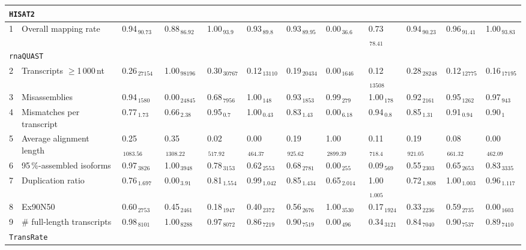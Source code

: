 \documentclass{scrartcl}
\begin{document}
\begin{landscape}
\begin{table}
\begin{scriptsize}
\begin{tabular}{llllllllllll}
\multicolumn{11}{l}{\texttt{HISAT2}}\\ 
\midrule
1 & Overall mapping rate  & 0.94$_{\,90.73}$ & 0.88$_{\,86.92}$ & 1.00$_{\,93.9}$ & 0.93$_{\,89.8}$ & 0.93$_{\,89.95}$ & 0.00$_{\,36.6}$ & 0.73$_{\,78.41}$ & 0.94$_{\,90.23}$ & 0.96$_{\,91.41}$ & 1.00$_{\,93.83}$ \\\midrule
\multicolumn{11}{l}{\texttt{rnaQUAST}}\\ 
\midrule
2 & Transcripts $\geq$1\,000\,nt  & 0.26$_{\,27154}$ & 1.00$_{\,98196}$ & 0.30$_{\,30767}$ & 0.12$_{\,13110}$ & 0.19$_{\,20434}$ & 0.00$_{\,1646}$ & 0.12$_{\,13508}$ & 0.28$_{\,28248}$ & 0.12$_{\,12775}$ & 0.16$_{\,17195}$ \\3 & Misassemblies  & 0.94$_{\,1580}$ & 0.00$_{\,24845}$ & 0.68$_{\,7956}$ & 1.00$_{\,148}$ & 0.93$_{\,1853}$ & 0.99$_{\,279}$ & 1.00$_{\,178}$ & 0.92$_{\,2161}$ & 0.95$_{\,1262}$ & 0.97$_{\,943}$ \\4 & Mismatches per transcript  & 0.77$_{\,1.73}$ & 0.66$_{\,2.38}$ & 0.95$_{\,0.7}$ & 1.00$_{\,0.43}$ & 0.83$_{\,1.43}$ & 0.00$_{\,6.18}$ & 0.94$_{\,0.8}$ & 0.85$_{\,1.31}$ & 0.91$_{\,0.94}$ & 0.90$_{\,1}$ \\5 & Average alignment length  & 0.25$_{\,1083.56}$ & 0.35$_{\,1308.22}$ & 0.02$_{\,517.92}$ & 0.00$_{\,464.37}$ & 0.19$_{\,925.62}$ & 1.00$_{\,2899.39}$ & 0.11$_{\,718.4}$ & 0.19$_{\,921.05}$ & 0.08$_{\,661.32}$ & 0.00$_{\,462.09}$ \\6 & 95\,\%-assembled isoforms  & 0.97$_{\,3826}$ & 1.00$_{\,3948}$ & 0.78$_{\,3153}$ & 0.62$_{\,2553}$ & 0.68$_{\,2781}$ & 0.00$_{\,255}$ & 0.09$_{\,569}$ & 0.55$_{\,2303}$ & 0.65$_{\,2653}$ & 0.83$_{\,3335}$ \\7 & Duplication ratio  & 0.76$_{\,1.697}$ & 0.00$_{\,3.91}$ & 0.81$_{\,1.554}$ & 0.99$_{\,1.042}$ & 0.85$_{\,1.434}$ & 0.65$_{\,2.014}$ & 1.00$_{\,1.005}$ & 0.72$_{\,1.808}$ & 1.00$_{\,1.003}$ & 0.96$_{\,1.117}$ \\\midrule
8 & Ex90N50  & 0.60$_{\,2753}$ & 0.45$_{\,2461}$ & 0.18$_{\,1947}$ & 0.40$_{\,2372}$ & 0.56$_{\,2676}$ & 1.00$_{\,3530}$ & 0.17$_{\,1924}$ & 0.33$_{\,2236}$ & 0.59$_{\,2735}$ & 0.00$_{\,1603}$ \\9 & \# full-length transcripts  & 0.98$_{\,8101}$ & 1.00$_{\,8288}$ & 0.97$_{\,8072}$ & 0.86$_{\,7219}$ & 0.90$_{\,7519}$ & 0.00$_{\,496}$ & 0.34$_{\,3121}$ & 0.84$_{\,7040}$ & 0.90$_{\,7537}$ & 0.89$_{\,7410}$ \\\midrule
\multicolumn{11}{l}{\texttt{TransRate}}\\ 
\midrule

\end{tabular}
\end{scriptsize}
\end{table}
\end{landscape}
\end{document}
